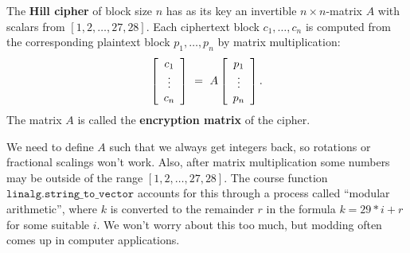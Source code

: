 \documentclass{ximera}
\begin{document}
\begin{definition}\label{def:hill-cipher}
  The \textbf{Hill cipher} of block size $n$ has as its key an
  invertible $n\times n$-matrix $A$ with scalars from $[1, 2, \ldots, 27, 28]$. Each
  ciphertext block $c_1,\ldots,c_n$ is computed from the corresponding
  plaintext block $p_1,\ldots,p_n$ by matrix multiplication:
  \begin{equation*}
    \startmat{c}c_1\\\vdots\\c_n\stopmat
    ~=~ A\startmat{c}p_1\\\vdots\\p_n\stopmat.
  \end{equation*}
  The matrix $A$ is called the \textbf{encryption matrix} of the cipher.

  \begin{remark}
    We need to define $A$ such that we always get integers back, so rotations or fractional scalings won't work. Also, after matrix multiplication some numbers may be outside of the range $[1, 2, \ldots, 27, 28]$. The course function $\texttt{linalg.string\_to\_vector}$ accounts for this through a process called ``modular arithmetic'', where $k$ is converted to the remainder $r$ in the formula $k=29*i+r$ for some suitable $i$. We won't worry about this too much, but modding often comes up in computer applications.
  \end{remark}
\end{definition}
\end{document}
